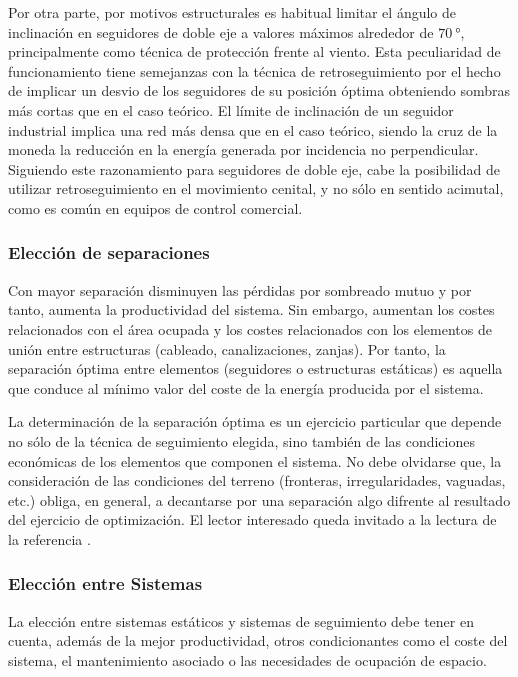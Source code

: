 Por otra parte, por motivos estructurales es habitual limitar 
el ángulo de inclinación en seguidores 
de doble eje a valores máximos alrededor de $\SI{70}{\degree}$, principalmente como
técnica de protección frente al viento. Esta peculiaridad de funcionamiento
tiene semejanzas con la técnica de retroseguimiento por el hecho de
implicar un desvio de los seguidores de su posición óptima obteniendo
sombras más cortas que en el caso teórico.  El límite de inclinación 
de un seguidor industrial implica una red más densa
que en el caso teórico, siendo la cruz de la moneda la reducción en
la energía generada por incidencia no perpendicular. 
Siguiendo este razonamiento para seguidores de doble eje, cabe la posibilidad de
utilizar retroseguimiento en el movimiento cenital, y no sólo en
sentido acimutal, como es común en equipos de control comercial.

\subsubsection{Elección de separaciones}
\label{sec:EleccionSeparaciones}

Con mayor separación disminuyen las pérdidas por sombreado
mutuo y por tanto, aumenta la productividad del sistema. Sin embargo, aumentan los costes relacionados con
el área ocupada y los costes relacionados con los elementos de unión
entre estructuras (cableado, canalizaciones, zanjas). 
Por tanto, la separación óptima entre elementos (seguidores o estructuras
estáticas) es aquella que conduce al mínimo valor del coste
de la energía producida por el sistema. 

La determinación de la separación óptima es un ejercicio
particular que depende no sólo de la técnica de
seguimiento elegida, sino también de las condiciones económicas de los
elementos que componen el sistema. No debe olvidarse que, la
consideración de las condiciones del terreno (fronteras, irregularidades, vaguadas,
etc.) obliga, en general, a decantarse por una separación algo difrente al
resultado del ejercicio de optimización.  El lector interesado queda
invitado a la lectura de la referencia \cite{Perpinan2012}.


\subsubsection{Elección entre Sistemas}
\label{sec:eleccion-sistemas}

La elección entre sistemas estáticos y sistemas de seguimiento debe
tener en cuenta, además de la mejor productividad, otros
condicionantes como el coste del sistema, el mantenimiento asociado o
las necesidades de ocupación de espacio. 

